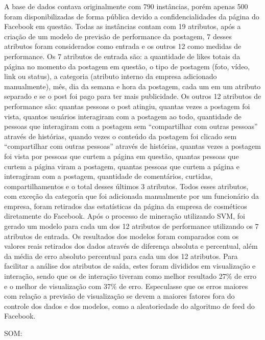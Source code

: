 A base de dados contava originalmente com 790 instâncias, porém apenas 500 foram disponibilizadas de forma pública devido a confidencialidades da página do Facebook em questão. Todas as instâncias contam com 19 atributos, após a criação de um modelo de previsão de performance da postagem, 7 desses atributos foram considerados como entrada e os outros 12 como medidas de performance.
Os 7 atributos de entrada são: a quantidade de likes totais da página no momento da postagem em questão, o tipo de postagem (foto, vídeo, link ou status), a categoria (atributo interno da empresa adicionado manualmente), mês, dia da semana e hora da postagem, cada um em um atributo separado e se o post foi pago para ter mais publicidade. Os outros 12 atributos de performance são: quantas pessoas o post atingiu, quantas vezes a postagem foi vista, quantos usuários interagiram com a postagem ao todo, quantidade de pessoas que interagiram com a postagem sem “compartilhar com outras pessoas” através de histórias, quando vezes o conteúdo da postagem foi clicado sem “compartilhar com outras pessoas” através de histórias, quantas vezes a postagem foi vista por pessoas que curtem a página em questão, quantas pessoas que curtem a página viram a postagem, quantas pessoas que curtem a página e interagiram com a postagem, quantidade de comentários, curtidas, compartilhamentos e o total desses últimos 3 atributos. Todos esses atributos, com exceção da categoria que foi adicionada manualmente por um funcionário da empresa, foram retirados das estatísticas da página da empresa de cosméticos diretamente do Facebook.
Após o processo de mineração utilizando SVM, foi gerado um modelo para cada um dos 12 atributos de performance utilizando os 7 atributos de entrada. Os resultados dos modelos foram comparados com os valores reais retirados dos dados através de diferença absoluta e percentual, além da média de erro absoluto percentual para cada um dos 12 atributos. Para facilitar a análise dos atributos de saída, estes foram divididos em visualização e interação, sendo que os de interação tiveram como melhor resultado 27\% de erro e o melhor de visualização com 37\% de erro. Especulasse que os erros maiores com relação a previsão de visualização se devem a maiores fatores fora do controle dos dados e dos modelos, como a aleatoriedade do algoritmo de feed do Facebook.

SOM:

